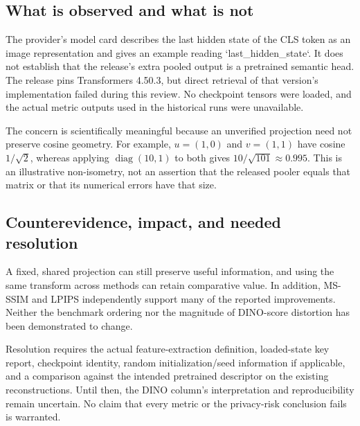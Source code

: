 \documentclass[10pt]{article}
\begin{document}
\subsection*{What is observed and what is not}
The provider’s model card describes the last hidden state of the CLS token as an image representation and gives an example reading `last\_hidden\_state`. It does not establish that the release’s extra pooled output is a pretrained semantic head. The release pins Transformers 4.50.3, but direct retrieval of that version’s implementation failed during this review. No checkpoint tensors were loaded, and the actual metric outputs used in the historical runs were unavailable.\par
The concern is scientifically meaningful because an unverified projection need not preserve cosine geometry. For example, \(u=(1,0)\) and \(v=(1,1)\) have cosine \(1/\sqrt2\), whereas applying \(\operatorname{diag}(10,1)\) to both gives \(10/\sqrt{101}\approx0.995\). This is an illustrative non-isometry, not an assertion that the released pooler equals that matrix or that its numerical errors have that size.\par
\subsection*{Counterevidence, impact, and needed resolution}
A fixed, shared projection can still preserve useful information, and using the same transform across methods can retain comparative value. In addition, MS-SSIM and LPIPS independently support many of the reported improvements. Neither the benchmark ordering nor the magnitude of DINO-score distortion has been demonstrated to change.\par
Resolution requires the actual feature-extraction definition, loaded-state key report, checkpoint identity, random initialization/seed information if applicable, and a comparison against the intended pretrained descriptor on the existing reconstructions. Until then, the DINO column’s interpretation and reproducibility remain uncertain. No claim that every metric or the privacy-risk conclusion fails is warranted.\par
\end{document}
